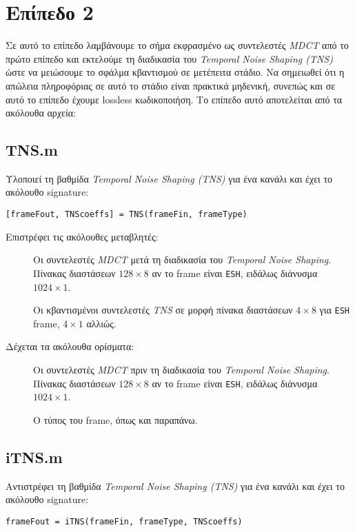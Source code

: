\section*{Επίπεδο 2}
Σε αυτό το επίπεδο λαμβάνουμε το σήμα εκφρασμένο ως συντελεστές \emph{MDCT} από
το πρώτο επίπεδο και εκτελούμε τη διαδικασία του \emph{Temporal Noise Shaping
(TNS)} ώστε να μειώσουμε το σφάλμα κβαντισμού σε μετέπειτα στάδιο. Να σημειωθεί
ότι η απώλεια πληροφόριας σε αυτό το στάδιο είναι πρακτικά μηδενική, συνεπώς
και σε αυτό το επίπεδο έχουμε lossless κωδικοποιήση. Το επίπεδο αυτό
αποτελείται από τα ακόλουθα αρχεία:


\subsection*{TNS.m}
Υλοποιεί τη βαθμίδα \emph{Temporal Noise Shaping (TNS)} για ένα κανάλι και έχει
το ακόλουθο signature:
\begin{center}
	\verb|[frameFout, TNScoeffs] = TNS(frameFin, frameType)|
\end{center}

\noindent Επιστρέφει τις ακόλουθες μεταβλητές:
\begin{description}
\item[] Οι συντελεστές \emph{MDCT} μετά τη διαδικασία του
	\emph{Temporal Noise Shaping}. Πίνακας διαστάσεων $128 \times 8$ αν το
	frame είναι \verb|ESH|, ειδάλως διάνυσμα $1024 \times 1$.
\item[] Οι κβαντισμένοι συντελεστές \emph{TNS} σε μορφή πίνακα
	διαστάσεων $4 \times 8$ για \verb|ESH| frame, $4 \times 1$ αλλιώς.
\end{description}

\noindent Δέχεται τα ακόλουθα ορίσματα:
\begin{description}
\item[] Οι συντελεστές \emph{MDCT} πριν τη διαδικασία του
	\emph{Temporal Noise Shaping}. Πίνακας διαστάσεων $128 \times 8$ αν το
	frame είναι \verb|ESH|, ειδάλως διάνυσμα $1024 \times 1$.
\item[] Ο τύπος του frame, όπως και παραπάνω.
\end{description}


\subsection*{iTNS.m}
Αντιστρέφει τη βαθμίδα \emph{Temporal Noise Shaping (TNS)} για ένα κανάλι και
έχει το ακόλουθο signature:
\begin{center}
	\verb|frameFout = iTNS(frameFin, frameType, TNScoeffs)|
\end{center}

